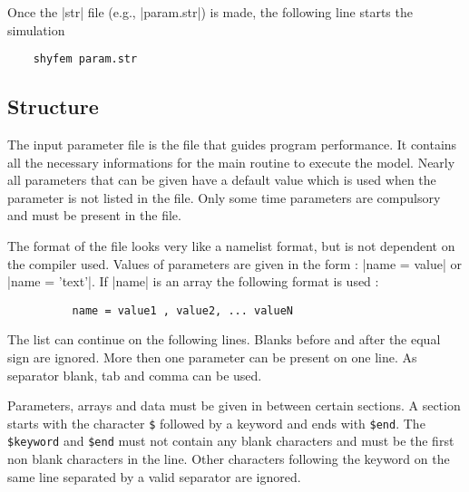 
%
%
%
%
%
%
%

Once the |str| file (e.g., |param.str|) is made, the following line
starts the simulation
\begin{verbatim}
	shyfem param.str
\end{verbatim}

\subsection{Structure}

The input parameter file is the file that guides program performance. It
contains all the necessary informations for the main routine to execute
the model. Nearly all parameters that can be given have a default value
which is used when the parameter is not listed in the file. Only some
time parameters are compulsory and must be present in the file.

The format of the file looks very like a namelist format, but is
not dependent on the compiler used. Values of parameters are given
in the form :  
|name = value|  or  |name = 'text'|.  If |name|
is an array the following format is used : 
\begin{verbatim}
          name = value1 , value2, ... valueN
\end{verbatim}
The list can continue on the following lines. Blanks before and after
the equal sign are ignored. More then one parameter can be present
on one line. As separator blank, tab and comma can be used.

Parameters, arrays and data must be given in between certain sections.
A section starts with the character {\tt \$} followed by a keyword and
ends with {\tt \$end}. The {\tt \$keyword} and {\tt \$end} must not
contain any blank characters and must be the first non blank characters
in the line. Other characters following the keyword on the same line
separated by a valid separator are ignored.

